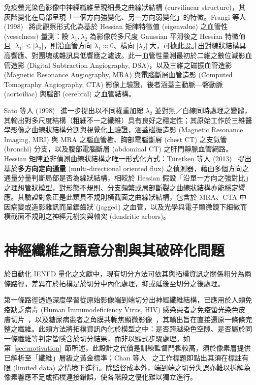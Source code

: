 免疫螢光染色影像中神經纖維呈現細長之曲線狀結構 (curvilinear structure)，其灰階變化在局部呈現「一個方向強變化、另一方向弱變化」的特徵。Frangi 等人 (1998)~\cite{frangi1998multiscale} 將此觀察形式化為基於 Hessian 矩陣特徵值 (eigenvalue) 之血管性 (vesselness) 量測：設 $\lambda_1, \lambda_2$ 為影像於多尺度 Gaussian 平滑後之 Hessian 特徵值且 $|\lambda_1| \le |\lambda_2|$，則沿血管方向 $\lambda_1 \approx 0$、橫向 $|\lambda_2|$ 大，可據此設計出對線狀結構具高響應、對團塊或雜訊具低響應之濾波。此一血管性量測最初於二維之數位減影血管造影 (Digital Subtraction Angiography, DSA)，以及三維之磁振血管造影 (Magnetic Resonance Angiography, MRA) 與電腦斷層血管造影 (Computed Tomography Angiography, CTA) 影像上驗證，後者涵蓋主動脈—髂動脈 (aortoiliac) 與腦部 (cerebral) 之血管結構。

Sato 等人 (1998)~\cite{sato1998three} 進一步提出以不同權重加總 $\lambda_2$ 並對黑／白線同時處理之變體，其輸出對多尺度結構（粗細不一之纖維）具有良好之穩定性；其原始工作於三維醫學影像之曲線狀結構分割與視覺化上驗證，涵蓋磁振造影 (Magnetic Resonance Imaging, MRI) 與 MRA 之腦血管樹、胸部電腦斷層 (chest CT) 之支氣管 (bronchi) 分支，以及腹部電腦斷層 (abdominal CT) 之肝門靜脈血管網路。Hessian 矩陣並非偵測曲線狀結構之唯一形式化方式：Türetken 等人 (2013)~\cite{turetken2013detecting} 提出基於\textbf{多方向定向通量} (multi-directional oriented flux) 之偵測器，藉由多個方向之通量分量判斷局部是否為線狀結構，相較於 Hessian 假設「沿單一方向之強對比」之理想管狀模型，對形態不規則、分支頻繁或局部斷裂之曲線狀結構亦能穩定響應。其驗證對象正是此類具不規則橫截面之曲線狀結構，包含於 MRA、CTA 中因病變或造影雜訊而呈鋸齒狀 (jagged) 之血管，以及光學與電子顯微鏡下細微而橫截面不規則之神經元樹突與軸突 (dendritic arbors)。

\section{神經纖維之語意分割與其破碎化問題}
\label{sec:segmentation}

於自動化 IENFD 量化之文獻中，現有切分方法可依其與拓樸資訊之關係粗分為兩條路徑，差異在於拓樸是於切分中內化處理，抑或延後至切分之後處理。

第一條路徑透過深度學習從原始影像端到端切分出神經纖維結構，已應用於人類免疫缺乏病毒 (Human Immunodeficiency Virus, HIV) 感染患者之免疫螢光染色皮膚切片~\cite{chan2022automated}，以及糖尿病患者之角膜共軛焦顯微影像~\cite{zhang2020automatic}，其輸出旨在直接還原一條條完整之纖維。此類方法將拓樸資訊內化於模型之中：是否跨越染色空隙、是否屬於同一條纖維等判定皆隱含於切分結果，而非以顯式步驟處理。如第~\ref{sec:motivation}~節所述，此設計之代價是訓練監督門檻較高，須於像素層提供已解析至「纖維」層級之黃金標準；Chan 等人~\cite{chan2022automated} 之工作標題即點出其須在標註有限 (limited data) 之情境下進行。除監督成本外，端到端之切分失誤亦難以拆解為像素響應不足或拓樸連接錯誤，使各階段之優化難以獨立進行。

